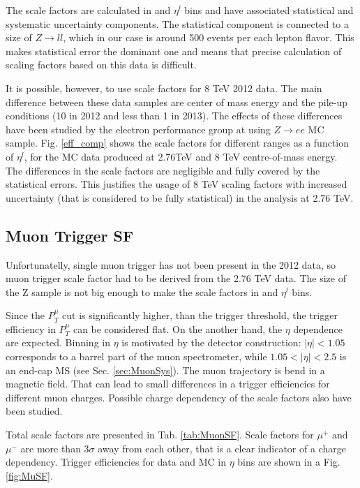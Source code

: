 The scale factors are calculated in \ptl and $\eta^{l}$ bins and have associated statistical and systematic uncertainty components. The statistical component is connected to a size of $Z\to ll$, which in our case is around 500 events per each lepton flavor. This makes statistical error the dominant one and means that precise calculation of scaling factors based on this data is difficult.

It is possible, however, to use scale factors for 8 TeV 2012 data\cite{ElecEff}. The main difference between these data samples are center of mass energy and the pile-up conditions (10 in 2012 and less than 1 in 2013). The effects of these differences have been studied by the electron performance group at \atlas using $Z\to ee$ MC sample. Fig. \ref{eff_comp} shows the scale factors for different \ptl ranges as a function of $\eta^{l}$, for the MC data produced at 2.76TeV and 8 TeV centre-of-mass energy. The differences in the scale factors are negligible and fully covered by the statistical errors. This justifies the usage of 8 TeV scaling factors with increased uncertainty (that is considered to be fully statistical) in the analysis at 2.76 TeV. 


\subsection{Muon Trigger SF}
Unfortunatelly, single muon trigger has not been present in the 2012 data, so muon trigger scale factor had to be derived from the 2.76 TeV data. The size of the Z sample is not big enough to make the scale factors in \ptl and $\eta^{l}$ bins. 

Since the $P_{T}^{\mu}$ cut is significantly higher, than the trigger threshold, the trigger efficiency in $P_{T}^{\mu}$ can be considered flat. On the another hand, the $\eta$ dependence are expected. Binning in $\eta$ is motivated by the detector construction: $|\eta|<1.05$ corresponds to a barrel part of the muon spectrometer, while $1.05<|\eta|<2.5$ is an end-cap MS (see Sec. \ref{sec:MuonSys}). The muon trajectory is bend in a magnetic field. That can lead to small differences in a trigger efficiencies for different muon charges. Possible charge dependency of the scale factors also have been studied. 

Total scale factors are presented in Tab. \ref{tab:MuonSF}. Scale factors for $\mu^{+}$ and $\mu^{-}$ are more than 3$\sigma$ away from each other, that is a clear indicator of a charge dependency. Trigger efficiencies for data and MC in $\eta$ bins are shown in a Fig. \ref{fig:MuSF}. 

